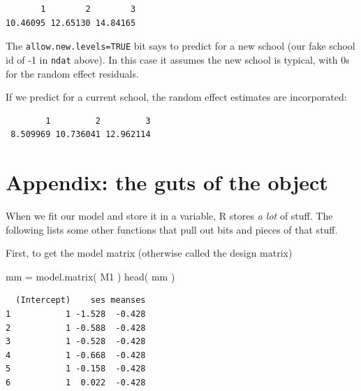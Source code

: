 \documentclass[
  letterpaper,
  DIV=11,
  numbers=noendperiod]{scrreprt}
\newenvironment{Shaded}{\begin{snugshade}}{\end{snugshade}}
\newcommand{\AttributeTok}[1]{\textcolor[rgb]{0.49,0.56,0.16}{#1}}
\newcommand{\DecValTok}[1]{\textcolor[rgb]{0.25,0.63,0.44}{#1}}
\newcommand{\FunctionTok}[1]{\textcolor[rgb]{0.02,0.16,0.49}{#1}}
\newcommand{\NormalTok}[1]{\textcolor[rgb]{0.00,0.44,0.13}{#1}}
\newcommand{\OtherTok}[1]{\textcolor[rgb]{0.00,0.44,0.13}{#1}}
\newcommand{\SpecialCharTok}[1]{\textcolor[rgb]{0.25,0.44,0.63}{#1}}
\begin{document}
\begin{verbatim}
       1        2        3 
10.46095 12.65130 14.84165 
\end{verbatim}

The \texttt{allow.new.levels=TRUE} bit says to predict for a new school
(our fake school id of -1 in \texttt{ndat} above). In this case it
assumes the new school is typical, with 0s for the random effect
residuals.

If we predict for a current school, the random effect estimates are
incorporated:

\begin{Shaded}
\end{Shaded}

\begin{verbatim}
        1         2         3 
 8.509969 10.736041 12.962114 
\end{verbatim}

\hypertarget{appendix-the-guts-of-the-object}{%
\section{Appendix: the guts of the
object}\label{appendix-the-guts-of-the-object}}

When we fit our model and store it in a variable, R stores \emph{a lot}
of stuff. The following lists some other functions that pull out bits
and pieces of that stuff.

First, to get the model matrix (otherwise called the design matrix)

\begin{Shaded}
\begin{Highlighting}[]
\NormalTok{mm }\OtherTok{=} \FunctionTok{model.matrix}\NormalTok{( M1 )}
\FunctionTok{head}\NormalTok{( mm )}
\end{Highlighting}
\end{Shaded}

\begin{verbatim}
  (Intercept)    ses meanses
1           1 -1.528  -0.428
2           1 -0.588  -0.428
3           1 -0.528  -0.428
4           1 -0.668  -0.428
5           1 -0.158  -0.428
6           1  0.022  -0.428
\end{verbatim}
\end{document}
